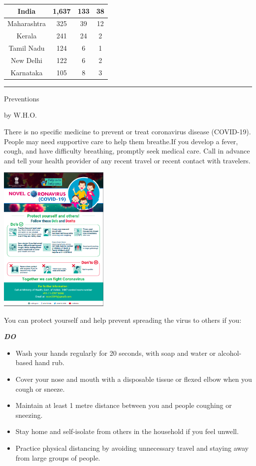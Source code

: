 \documentclass[10pt,a4paper]{article}
\newcommand{\SepRule}{\noindent							 %
						\begin{center}
							\rule{250pt}{1pt}
						\end{center}
						}
\newcommand{\NewsItem}[1]{%
		\usefont{T1}{augie}{m}{n} 	
		\large #1 \vspace{4pt}
		\par \normalsize \normalfont}
\newcommand{\NewsAuthor}[1]{%
			\hfill by \textsc{#1} \vspace{4pt}
			\par \normalfont}
\begin{document}
\begin{multicols}{2}
\begin{center}
\begin{tabular}{||c c c c||}
             \hline \hline
             India & 1,637 & 133 & 38 \\
             \hline \hline
              Maharashtra & 325 & 39 & 12 \\
             \hline
              Kerala & 241 & 24 & 2 \\
             \hline
              Tamil Nadu & 124 & 6 & 1 \\
             \hline
              New Delhi & 122 & 6 & 2 \\
             \hline
              Karnataka & 105 & 8 & 3 \\
             \hline
        \end{tabular}
    \end{center}

\vspace{0.5cm}
	\SepRule
\vspace{0.5cm}
\NewsItem{Preventions}
\NewsAuthor{W.H.O.}
    There is no specific medicine to prevent or treat coronavirus disease (COVID-19). People may need supportive care to help them breathe.\linebreak If you develop a fever, cough, and have difficulty breathing, promptly seek medical care. Call in advance and tell your health provider of any recent travel or recent contact with travelers.
    \begin{center}
			\includegraphics[width=0.4\textwidth]{dos.png}
	\end{center}
	You can protect yourself and help prevent spreading the virus to others if you:
	\begin{flushleft}\textbf{\textit{DO}}\end{flushleft}
	\begin{itemize}
	    \item Wash your hands regularly for 20 seconds, with soap and water or alcohol-based hand rub.
	    \item Cover your nose and mouth with a disposable tissue or flexed elbow when you cough or sneeze.
	    \item Maintain at least 1 metre distance between you and people coughing or sneezing.
	    \item Stay home and self-isolate from others in the household if you feel unwell.
	    \item Practice physical distancing by avoiding unnecessary travel and staying away from large groups of people.
	    

\end{itemize}
\end{multicols}
\end{document}
